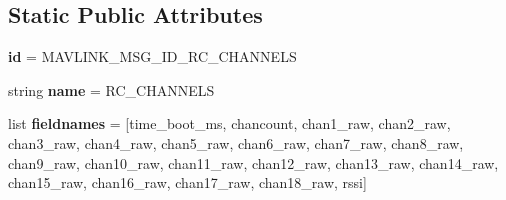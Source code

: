 \subsection*{Static Public Attributes}
\begin{DoxyCompactItemize}
\item 
\mbox{\label{classpymavlink_1_1dialects_1_1v10_1_1MAVLink__rc__channels__message_aa3aee50980e71baf53fd525cfe9fa8a0}} 
{\bfseries id} = M\+A\+V\+L\+I\+N\+K\+\_\+\+M\+S\+G\+\_\+\+I\+D\+\_\+\+R\+C\+\_\+\+C\+H\+A\+N\+N\+E\+LS
\item 
\mbox{\label{classpymavlink_1_1dialects_1_1v10_1_1MAVLink__rc__channels__message_a95d9a3cb6c0e3bb921bdfc28be17af38}} 
string {\bfseries name} = \textquotesingle{}R\+C\+\_\+\+C\+H\+A\+N\+N\+E\+LS\textquotesingle{}
\item 
\mbox{\label{classpymavlink_1_1dialects_1_1v10_1_1MAVLink__rc__channels__message_ad6cdbd6659a03bb8fe205ed734763c3f}} 
list {\bfseries fieldnames} = \mbox{[}\textquotesingle{}time\+\_\+boot\+\_\+ms\textquotesingle{}, \textquotesingle{}chancount\textquotesingle{}, \textquotesingle{}chan1\+\_\+raw\textquotesingle{}, \textquotesingle{}chan2\+\_\+raw\textquotesingle{}, \textquotesingle{}chan3\+\_\+raw\textquotesingle{}, \textquotesingle{}chan4\+\_\+raw\textquotesingle{}, \textquotesingle{}chan5\+\_\+raw\textquotesingle{}, \textquotesingle{}chan6\+\_\+raw\textquotesingle{}, \textquotesingle{}chan7\+\_\+raw\textquotesingle{}, \textquotesingle{}chan8\+\_\+raw\textquotesingle{}, \textquotesingle{}chan9\+\_\+raw\textquotesingle{}, \textquotesingle{}chan10\+\_\+raw\textquotesingle{}, \textquotesingle{}chan11\+\_\+raw\textquotesingle{}, \textquotesingle{}chan12\+\_\+raw\textquotesingle{}, \textquotesingle{}chan13\+\_\+raw\textquotesingle{}, \textquotesingle{}chan14\+\_\+raw\textquotesingle{}, \textquotesingle{}chan15\+\_\+raw\textquotesingle{}, \textquotesingle{}chan16\+\_\+raw\textquotesingle{}, \textquotesingle{}chan17\+\_\+raw\textquotesingle{}, \textquotesingle{}chan18\+\_\+raw\textquotesingle{}, \textquotesingle{}rssi\textquotesingle{}\mbox{]}
\item 
\mbox{\label{classpymavlink_1_1dialects_1_1v10_1_1MAVLink__rc__channels__message_a1e5dd639cc5f6c919ccf2bf0ba58f385}} 

\end{DoxyCompactItemize}
